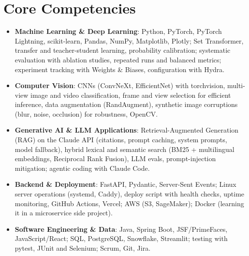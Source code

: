\documentclass[11pt,a4paper,sans]{moderncv}
\begin{document}
\section{Core Competencies}
\vspace{1pt}
\begin{itemize}

\item \textbf{Machine Learning \& Deep Learning}: Python, PyTorch, PyTorch Lightning, scikit-learn, Pandas, NumPy, Matplotlib, Plotly; Set Transformer, transfer and teacher-student learning, probability calibration; systematic evaluation with ablation studies, repeated runs and balanced metrics; experiment tracking with Weights \& Biases, configuration with Hydra.

\item \textbf{Computer Vision}: CNNs (ConvNeXt, EfficientNet) with torchvision, multi-view image and video classification, frame and view selection for efficient inference, data augmentation (RandAugment), synthetic image corruptions (blur, noise, occlusion) for robustness, OpenCV.

\item \textbf{Generative AI \& LLM Applications}: Retrieval-Augmented Generation (RAG) on the Claude API (citations, prompt caching, system prompts, model fallback), hybrid lexical and semantic search (BM25 + multilingual embeddings, Reciprocal Rank Fusion), LLM evals, prompt-injection mitigation; agentic coding with Claude Code.

\item \textbf{Backend \& Deployment}: FastAPI, Pydantic, Server-Sent Events; Linux server operations (systemd, Caddy), deploy script with health checks, uptime monitoring, GitHub Actions, Vercel; AWS (S3, SageMaker); Docker (learning it in a microservice side project).

\item \textbf{Software Engineering \& Data}: Java, Spring Boot, JSF/PrimeFaces, JavaScript/React; SQL, PostgreSQL, Snowflake, Streamlit; testing with pytest, JUnit and Selenium; Scrum, Git, Jira.

\end{itemize}

\end{document}
